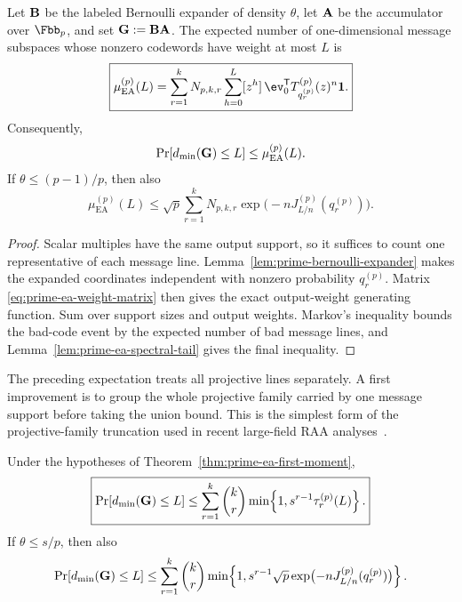 \begin{theorem}
\label{thm:prime-ea-first-moment}
Let $\mathbf B$ be the labeled Bernoulli expander of density $\theta$, let $\mathbf A$ be
the accumulator over $\Fbb_p$, and set $\mathbf G:=\mathbf B\mathbf A$.  The expected number of
one-dimensional message subspaces whose nonzero codewords have weight at most
$L$ is
\begin{equation}
 \boxed{
 \mu^{(p)}_{\mathrm{EA}}(L)
 =\sum_{r=1}^k N_{p,k,r}
   \sum_{h=0}^L[z^h]\,
   \ev_0^{\mathsf T}
   T^{(p)}_{q^{(p)}_r}(z)^n\boldsymbol 1.
 }
 \label{eq:prime-ea-first-moment}
\end{equation}
Consequently,
\begin{equation}
 \Pr[d_{\min}(\mathbf G)\leq L]
 \leq \mu^{(p)}_{\mathrm{EA}}(L).
 \label{eq:prime-ea-first-moment-failure}
\end{equation}
If $\theta\leq(p-1)/p$, then also
\begin{equation}
 \mu^{(p)}_{\mathrm{EA}}(L)
 \leq \sqrt p\sum_{r=1}^k N_{p,k,r}
       \exp\bigl(-nJ^{(p)}_{L/n}(q^{(p)}_r)\bigr).
 \label{eq:prime-ea-spectral-first-moment}
\end{equation}
\end{theorem}

\begin{proof}
Scalar multiples have the same output support, so it suffices to count one
representative of each message line.  Lemma~\ref{lem:prime-bernoulli-expander}
makes the expanded coordinates independent with nonzero probability
$q^{(p)}_r$.  Matrix \eqref{eq:prime-ea-weight-matrix} then gives the exact
output-weight generating function.  Sum over support sizes and output weights.
Markov's inequality bounds the bad-code event by the expected number of bad
message lines, and Lemma~\ref{lem:prime-ea-spectral-tail} gives the final
inequality.
\end{proof}

The preceding expectation treats all projective lines separately.  A first
improvement is to group the whole projective family carried by one message
support before taking the union bound.  This is the simplest form of the
projective-family truncation used in recent large-field RAA
analyses~\cite{akhiani26,khabbazian26}.

\begin{corollary}
\label{cor:prime-ea-support-grouped}
Under the hypotheses of Theorem~\ref{thm:prime-ea-first-moment},
\begin{equation}
 \boxed{
 \Pr[d_{\min}(\mathbf G)\leq L]
 \leq
 \sum_{r=1}^k\binom{k}{r}
 \min\!\left\{1,s^{r-1}\tau^{(p)}_r(L)\right\}.
 }
 \label{eq:prime-ea-support-grouped}
\end{equation}
If $\theta\leq s/p$, then also
\begin{equation}
 \Pr[d_{\min}(\mathbf G)\leq L]
 \leq
 \sum_{r=1}^k\binom{k}{r}
 \min\!\left\{1,
  s^{r-1}\sqrt p\exp\bigl(-nJ^{(p)}_{L/n}(q^{(p)}_r)\bigr)
 \right\}.
 \label{eq:prime-ea-support-grouped-spectral}
\end{equation}
\end{corollary}

